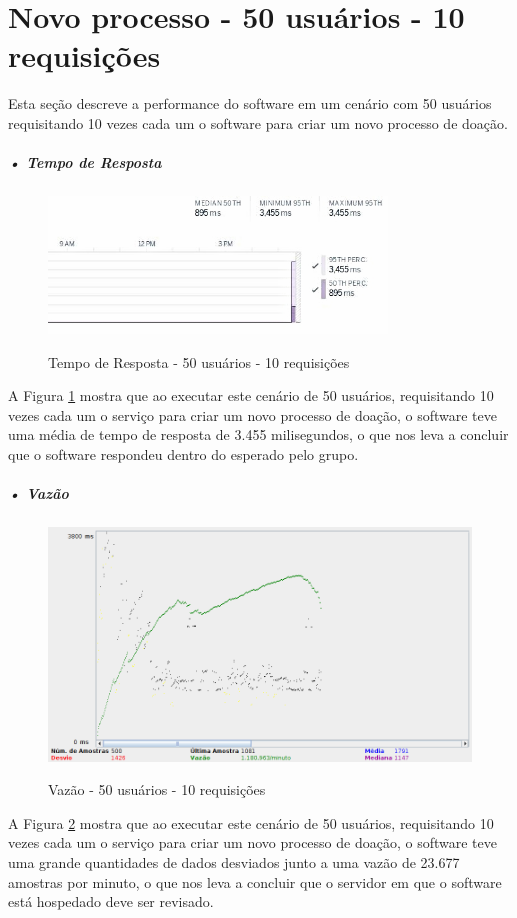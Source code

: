 \documentclass[portuguese,oneside]{tcc}
\begin{document}
\section{Novo processo - 50 usuários - 10 requisições}
Esta seção descreve a performance do software em um cenário com 50 usuários requisitando 10 vezes cada um o software para criar um novo processo de doação.

\subparagraph{• Tempo de Resposta}
\begin{figure}[htp]
\centering
\caption{Tempo de Resposta - 50 usuários - 10 requisições}
\includegraphics[width=9cm]{50-10-response-time}
\label{fig:tempo-reposta-50-10}
\end{figure}
A Figura \ref{fig:tempo-reposta-50-10} mostra que ao executar este cenário de 50 usuários, requisitando 10 vezes cada um o serviço para criar um novo processo de doação, o software teve uma média de tempo de resposta de 3.455 milisegundos, o que nos leva a concluir que o software respondeu dentro do esperado pelo grupo.

\subparagraph{• Vazão}
\begin{figure}[htp]
\centering
\caption{Vazão - 50 usuários - 10 requisições}
\includegraphics[width=15cm]{50-10-throughput}
\label{fig:throughput-50-10}
\end{figure}

A Figura \ref{fig:throughput-50-10} mostra que ao executar este cenário de 50 usuários, requisitando 10 vezes cada um o serviço para criar um novo processo de doação, o software teve uma grande quantidades de dados desviados junto a uma vazão de 23.677 amostras por minuto, o que nos leva a concluir que o servidor em que o software está hospedado deve ser revisado.
\end{document}

